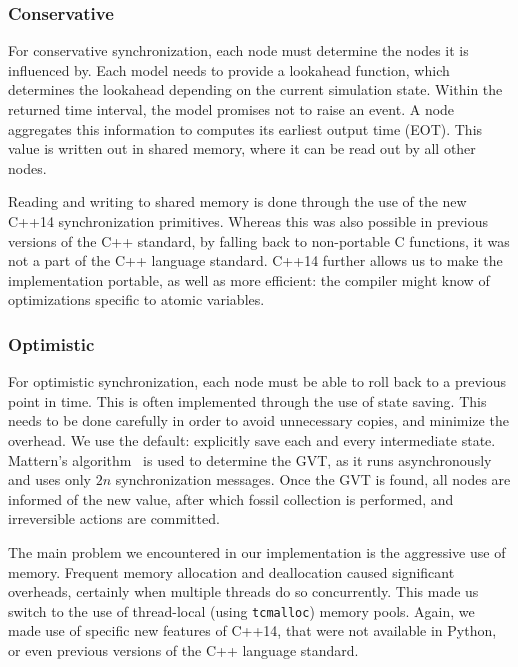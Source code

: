 \subsubsection{Conservative}
For conservative synchronization, each node must determine the nodes it is influenced by.
Each model needs to provide a lookahead function, which determines the lookahead depending on the current simulation state.
Within the returned time interval, the model promises not to raise an event.
A node aggregates this information to computes its earliest output time (EOT).
This value is written out in shared memory, where it can be read out by all other nodes.

Reading and writing to shared memory is done through the use of the new C++14 synchronization primitives.
Whereas this was also possible in previous versions of the C++ standard, by falling back to non-portable C functions, it was not a part of the C++ language standard.
C++14 further allows us to make the implementation portable, as well as more efficient: the compiler might know of optimizations specific to atomic variables.

\subsubsection{Optimistic}
For optimistic synchronization, each node must be able to roll back to a previous point in time.
This is often implemented through the use of state saving.
This needs to be done carefully in order to avoid unnecessary copies, and minimize the overhead.
We use the default: explicitly save each and every intermediate state.
Mattern's algorithm~\cite{mattern} is used to determine the GVT, as it runs asynchronously and uses only $2n$ synchronization messages.
Once the GVT is found, all nodes are informed of the new value, after which fossil collection is performed, and irreversible actions are committed.

The main problem we encountered in our implementation is the aggressive use of memory.
Frequent memory allocation and deallocation caused significant overheads, certainly when multiple threads do so concurrently.
This made us switch to the use of thread-local (using \texttt{tcmalloc}) memory pools.
Again, we made use of specific new features of C++14, that were not available in Python, or even previous versions of the C++ language standard.

